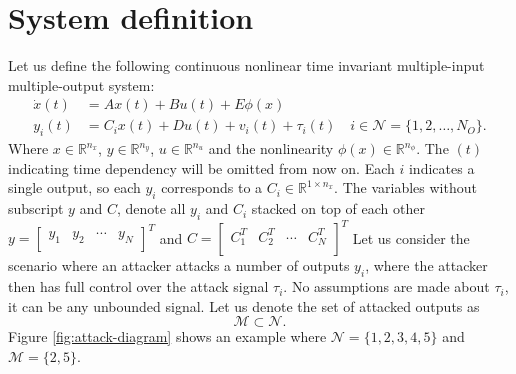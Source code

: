 \section{System definition}\label{ch:system-definition}
Let us define the following continuous nonlinear time invariant multiple-input multiple-output system: 
\begin{equation}\label{eqn:standard-system}
    \begin{split}
        \dot{x}(t) &= Ax(t) + Bu(t) + E\phi(x) \\
        y_i(t) &= C_ix(t) + Du(t) + v_i(t) + \tau_i(t) \quad i \in \mathcal{N} = \{1,2,\dots,N_O\}.
    \end{split}
\end{equation}
Where $x \in \mathbb{R}^{n_x}$, $y \in \mathbb{R}^{n_y}$, $u \in \mathbb{R}^{n_u}$ and the nonlinearity $\phi(x) \in \mathbb{R}^{n_{\phi}}$. The $(t)$ indicating time dependency will be omitted from now on. Each $i$ indicates a single output, so each $y_i$ corresponds to a $C_i \in \mathbb{R}^{1 \times n_x}$. The variables without subscript $y$ and $C$, denote all $y_i$ and $C_i$ stacked on top of each other 
$y = 
\begin{bmatrix}
    y_1 & y_2 & \cdots & y_{N} \\
\end{bmatrix}^{T}$ and
$C =
\begin{bmatrix}
    C_1^T & C_2^T & \cdots & C_N^T \\
\end{bmatrix}^{T}$
Let us consider the scenario where an attacker attacks a number of outputs $y_i$, where the attacker then has full control over the attack signal $\tau_i$. No assumptions are made about $\tau_i$, it can be any unbounded signal. Let us denote the set of attacked outputs as 
\begin{equation}\label{eqn:M-definition}
    \mathcal{M} \subset \mathcal{N}.
\end{equation}
Figure \ref{fig:attack-diagram} shows an example where $\mathcal{N}=\{1,2,3,4,5\}$ and $\mathcal{M} = \{2,5\}$.

